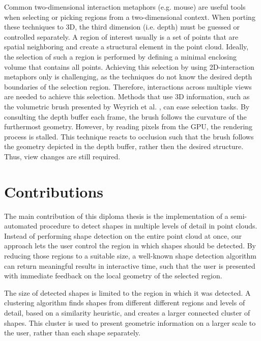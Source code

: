 \par

Common two-dimensional interaction metaphors (e.g. mouse) are useful tools when selecting or picking regions from a two-dimensional context. When porting these techniques to 3D, the third dimension (i.e. depth) must be guessed or controlled separately. A region of interest usually is a set of points that are spatial neighboring and create a structural element in the point cloud. Ideally, the selection of such a region is performed by defining a minimal enclosing volume that contains all points. Achieving this selection by using 2D-interaction metaphors only is challenging, as the techniques do not know the desired depth boundaries of the selection region. Therefore, interactions across multiple views are needed to achieve this selection. Methods that use 3D information, such as the volumetric brush presented by Weyrich et al. \cite{weyrich2004post}, can ease selection tasks. By consulting the depth buffer each frame, the brush follows the curvature of the furthermost geometry. However, by reading pixels from the GPU, the rendering process is stalled. This technique reacts to occlusion such that the brush follows the geometry depicted in the depth buffer, rather then the desired structure. Thus, view changes are still required.


\section{Contributions}

The main contribution of this diploma thesis is the implementation of a semi-automated procedure to detect shapes in multiple levels of detail in point clouds. Instead of performing shape detection on the entire point cloud at once, our approach lets the user control the region in which shapes should be detected. By reducing those regions to a suitable size, a well-known shape detection algorithm can return meaningful results in interactive time, such that the user is presented with immediate feedback on the local geometry of the selected region. 

\par

The size of detected shapes is limited to the region in which it was detected. A clustering algorithm finds shapes from different different regions and levels of detail, based on a similarity heuristic, and creates a larger connected cluster of shapes. This cluster is used to present geometric information on a larger scale to the user, rather than each shape separately. 

